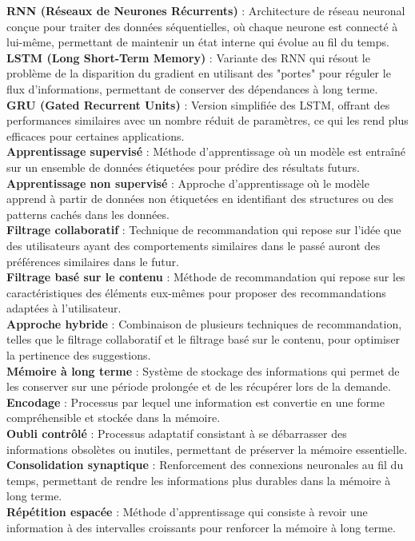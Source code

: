 \documentclass[11pt,a4paper]{report}
\begin{document}
\textbf{RNN (Réseaux de Neurones Récurrents)} : Architecture de réseau neuronal conçue pour traiter des données séquentielles, où chaque neurone est connecté à lui-même, permettant de maintenir un état interne qui évolue au fil du temps.\\
\textbf{LSTM (Long Short-Term Memory)} : Variante des RNN qui résout le problème de la disparition du gradient en utilisant des "portes" pour réguler le flux d’informations, permettant de conserver des dépendances à long terme.\\
\textbf{GRU (Gated Recurrent Units)} : Version simplifiée des LSTM, offrant des performances similaires avec un nombre réduit de paramètres, ce qui les rend plus efficaces pour certaines applications.\\
\textbf{Apprentissage supervisé} : Méthode d’apprentissage où un modèle est entraîné sur un ensemble de données étiquetées pour prédire des résultats futurs.\\
\textbf{Apprentissage non supervisé} : Approche d’apprentissage où le modèle apprend à partir de données non étiquetées en identifiant des structures ou des patterns cachés dans les données.\\
\textbf{Filtrage collaboratif} : Technique de recommandation qui repose sur l'idée que des utilisateurs ayant des comportements similaires dans le passé auront des préférences similaires dans le futur.\\
\textbf{Filtrage basé sur le contenu} : Méthode de recommandation qui repose sur les caractéristiques des éléments eux-mêmes pour proposer des recommandations adaptées à l’utilisateur.\\
\textbf{Approche hybride} : Combinaison de plusieurs techniques de recommandation, telles que le filtrage collaboratif et le filtrage basé sur le contenu, pour optimiser la pertinence des suggestions.\\
\textbf{Mémoire à long terme} : Système de stockage des informations qui permet de les conserver sur une période prolongée et de les récupérer lors de la demande.\\
\textbf{Encodage} : Processus par lequel une information est convertie en une forme compréhensible et stockée dans la mémoire.\\
\textbf{Oubli contrôlé} : Processus adaptatif consistant à se débarrasser des informations obsolètes ou inutiles, permettant de préserver la mémoire essentielle.\\
\textbf{Consolidation synaptique} : Renforcement des connexions neuronales au fil du temps, permettant de rendre les informations plus durables dans la mémoire à long terme.\\
\textbf{Répétition espacée} : Méthode d’apprentissage qui consiste à revoir une information à des intervalles croissants pour renforcer la mémoire à long terme.\\
\end{document}
